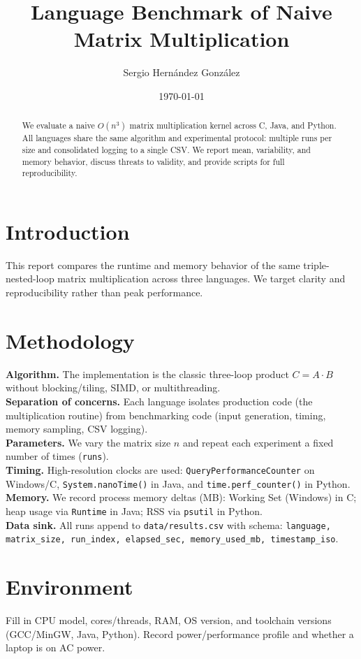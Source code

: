 \documentclass[11pt,a4paper]{article}
\title{Language Benchmark of Naive Matrix Multiplication}
\author{Sergio Hernández González}
\date{\today}
\begin{document}
\maketitle

\begin{abstract}
We evaluate a naive $O(n^3)$ matrix multiplication kernel across C, Java, and Python. All languages share the same algorithm and experimental protocol: multiple runs per size and consolidated logging to a single CSV. We report mean, variability, and memory behavior, discuss threats to validity, and provide scripts for full reproducibility.
\end{abstract}

\section{Introduction}
This report compares the runtime and memory behavior of the same triple-nested-loop matrix multiplication across three languages. We target clarity and reproducibility rather than peak performance.

\section{Methodology}
\textbf{Algorithm.} The implementation is the classic three-loop product $C=A\cdot B$ without blocking/tiling, SIMD, or multithreading.\\
\textbf{Separation of concerns.} Each language isolates production code (the multiplication routine) from benchmarking code (input generation, timing, memory sampling, CSV logging).\\
\textbf{Parameters.} We vary the matrix size $n$ and repeat each experiment a fixed number of times (\texttt{runs}).\\
\textbf{Timing.} High-resolution clocks are used: \texttt{QueryPerformanceCounter} on Windows/C, \texttt{System.nanoTime()} in Java, and \texttt{time.perf\_counter()} in Python.\\
\textbf{Memory.} We record process memory deltas (MB): Working Set (Windows) in C; heap usage via \texttt{Runtime} in Java; RSS via \texttt{psutil} in Python.\\
\textbf{Data sink.} All runs append to \texttt{data/results.csv} with schema: \texttt{language, matrix\_size, run\_index, elapsed\_sec, memory\_used\_mb, timestamp\_iso}.

\section{Environment}
Fill in CPU model, cores/threads, RAM, OS version, and toolchain versions (GCC/MinGW, Java, Python). Record power/performance profile and whether a laptop is on AC power.
\end{document}
